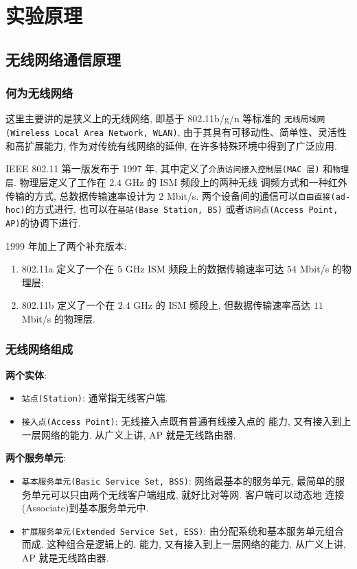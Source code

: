 \documentclass[../main.tex]{subfiles}
\begin{document}
\section{实验原理}
\subsection{无线网络通信原理}
\subsubsection*{何为无线网络}
这里主要讲的是狭义上的无线网络, 即基于 802.11b/g/n 等标准的
\texttt{无线局域网(Wireless Local Area Network, WLAN)},
由于其具有可移动性、简单性、灵活性和高扩展能力, 作为对传统有线网络的延伸,
在许多特殊环境中得到了广泛应用.

IEEE 802.11 第一版发布于 1997 年, 其中定义了\texttt{介质访问接入控制层(MAC 层)}
和\texttt{物理层}. 物理层定义了工作在 $ 2.4 $ GHz 的 ISM 频段上的两种无线
调频方式和一种红外传输的方式, 总数据传输速率设计为 $ 2 $ Mbit/s.
两个设备间的通信可以\texttt{自由直接(ad-hoc)}的方式进行, 也可以在\texttt{基站(Base Station, BS)}
或者\texttt{访问点(Access Point, AP)}的协调下进行.

1999 年加上了两个补充版本:
\begin{enumerate}
  \item 802.11a 定义了一个在 $ 5 $ GHz ISM 频段上的数据传输速率可达 $ 54 $
    Mbit/s 的物理层;
  \item 802.11b 定义了一个在 $ 2.4 $ GHz 的 ISM 频段上, 但数据传输速率高达
    $ 11 $ Mbit/s 的物理层.
\end{enumerate}
%
\subsubsection*{无线网络组成}
\textbf{两个实体}:
\begin{itemize}
  \item \texttt{站点(Station)}: 通常指无线客户端.
  \item \texttt{接入点(Access Point)}: 无线接入点既有普通有线接入点的
    能力, 又有接入到上一层网络的能力. 从广义上讲, AP 就是无线路由器.
\end{itemize}

\textbf{两个服务单元}:
\begin{itemize}
  \item \texttt{基本服务单元(Basic Service Set, BSS)}: 网络最基本的服务单元,
    最简单的服务单元可以只由两个无线客户端组成, 就好比对等网. 客户端可以动态地
    连接(Associate)到基本服务单元中.
  \item \texttt{扩展服务单元(Extended Service Set, ESS)}:
    由分配系统和基本服务单元组合而成. 这种组合是逻辑上的.
    能力, 又有接入到上一层网络的能力. 从广义上讲, AP 就是无线路由器.
\end{itemize}
%
\end{document}
